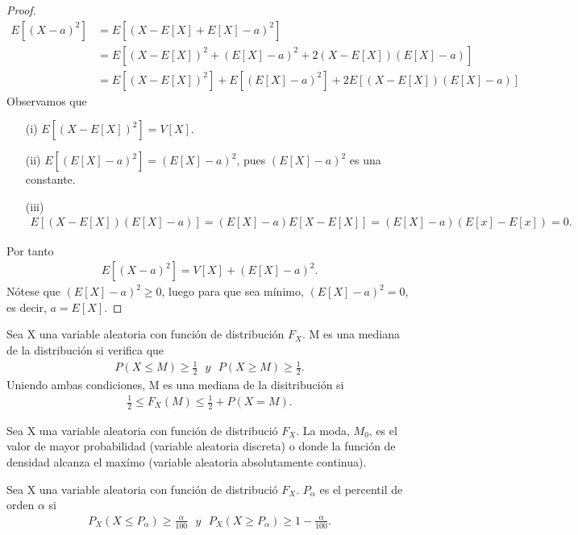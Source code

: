 \begin{proof}
\begin{align*}
    E[(X - a)^2] &= E[(X - E[X] + E[X] - a)^2]\\
    &= E[(X - E[X])^2 + (E[X] - a)^2 + 2(X - E[X])(E[X] - a)] \\
    &= E[(X - E[X])^2] + E[(E[X] - a)^2] + 2E[(X - E[X])(E[X] - a)]
\end{align*}
Observamos que
\begin{enumerate}
    \item[(i)] $E[(X - E[X])^2] = V[X]$.
    \item[(ii)] $E[(E[X] - a)^2] = (E[X] - a)^2$, pues $(E[X] - a)^2$ es una constante.
    \item[(iii)] 
    \begin{align*}
        E[(X - E[X])(E[X] - a)] = (E[X] - a)E[X - E[X]] = (E[X] - a)(E[x] - E[x]) = 0.
    \end{align*}
\end{enumerate}
Por tanto
\begin{align*}
     E[(X - a)^2] = V[X] + (E[X] - a)^2.
\end{align*}
Nótese que $(E[X] - a)^2 \ge 0$, luego para que sea mínimo, $(E[X] - a)^2 = 0$, es decir, $a = E[X]$.
\end{proof}

\begin{defi}[Mediana]
Sea X una variable aleatoria con función de distribución $F_X$. M es una mediana de la distribución si verifica que
\begin{align*}
    P(X \leq M) \ge \frac{1}{2} \ \ \ y \ \ \ P(X \ge M) \ge \frac{1}{2}.
\end{align*}
Uniendo ambas condiciones, M es una mediana de la disitribución si
\begin{align*}
    \frac{1}{2} \leq F_X(M) \leq \frac{1}{2} + P(X = M).
\end{align*}
\end{defi}

\begin{defi}[Moda]
Sea X una variable aleatoria con función de distribució $F_X$. La moda, $M_0$, es el valor de mayor probabilidad (variable aleatoria discreta) o donde la función de densidad alcanza el maxímo (variable aleatoria absolutamente continua).
\end{defi}

\begin{defi}[Percentiles]
Sea X una variable aleatoria con función de distribució $F_X$. $P_{\alpha}$ es el percentil de orden $\alpha$ si
\begin{align*}
    P_X(X \leq P_{\alpha}) \ge \frac{\alpha}{100} \ \ \ y \ \ \ P_X(X \ge P_{\alpha}) \ge 1 - \frac{\alpha}{100}.
\end{align*}
\end{defi}

